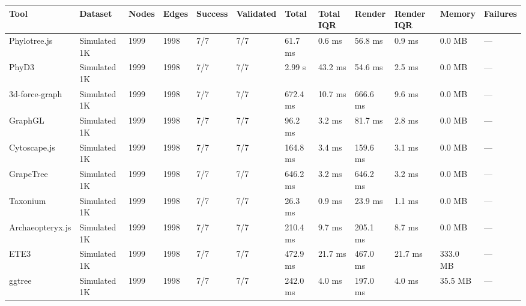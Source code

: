\begin{tabular}{llllllllllll}
\hline
Tool & Dataset & Nodes & Edges & Success & Validated & Total & Total IQR & Render & Render IQR & Memory & Failures \\
\hline
Phylotree.js & Simulated 1K & 1999 & 1998 & 7/7 & 7/7 & 61.7 ms & 0.6 ms & 56.8 ms & 0.9 ms & 0.0 MB & --- \\
PhyD3 & Simulated 1K & 1999 & 1998 & 7/7 & 7/7 & 2.99 s & 43.2 ms & 54.6 ms & 2.5 ms & 0.0 MB & --- \\
3d-force-graph & Simulated 1K & 1999 & 1998 & 7/7 & 7/7 & 672.4 ms & 10.7 ms & 666.6 ms & 9.6 ms & 0.0 MB & --- \\
GraphGL & Simulated 1K & 1999 & 1998 & 7/7 & 7/7 & 96.2 ms & 3.2 ms & 81.7 ms & 2.8 ms & 0.0 MB & --- \\
Cytoscape.js & Simulated 1K & 1999 & 1998 & 7/7 & 7/7 & 164.8 ms & 3.4 ms & 159.6 ms & 3.1 ms & 0.0 MB & --- \\
GrapeTree & Simulated 1K & 1999 & 1998 & 7/7 & 7/7 & 646.2 ms & 3.2 ms & 646.2 ms & 3.2 ms & 0.0 MB & --- \\
Taxonium & Simulated 1K & 1999 & 1998 & 7/7 & 7/7 & 26.3 ms & 0.9 ms & 23.9 ms & 1.1 ms & 0.0 MB & --- \\
Archaeopteryx.js & Simulated 1K & 1999 & 1998 & 7/7 & 7/7 & 210.4 ms & 9.7 ms & 205.1 ms & 8.7 ms & 0.0 MB & --- \\
ETE3 & Simulated 1K & 1999 & 1998 & 7/7 & 7/7 & 472.9 ms & 21.7 ms & 467.0 ms & 21.7 ms & 333.0 MB & --- \\
ggtree & Simulated 1K & 1999 & 1998 & 7/7 & 7/7 & 242.0 ms & 4.0 ms & 197.0 ms & 4.0 ms & 35.5 MB & --- \\
\hline
\end{tabular}
